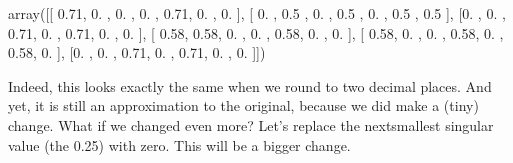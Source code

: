 \documentclass[letterpaper,10pt,english]{sphinxmanual}
\begin{document}
\begin{sphinxVerbatim}[commandchars=\\\{\}]
    
\PYG{p}{[}\PYG{p}{]}  
     
   
       
\end{sphinxVerbatim}

\begin{sphinxVerbatim}[commandchars=\\\{\}]
array([[ 0.71, \PYGZhy{}0.  ,  0.  , \PYGZhy{}0.  ,  0.71, \PYGZhy{}0.  , \PYGZhy{}0.  ],
       [ 0.  ,  0.5 , \PYGZhy{}0.  ,  0.5 , \PYGZhy{}0.  ,  0.5 ,  0.5 ],
       [\PYGZhy{}0.  , \PYGZhy{}0.  ,  0.71, \PYGZhy{}0.  ,  0.71, \PYGZhy{}0.  , \PYGZhy{}0.  ],
       [ 0.58,  0.58,  0.  ,  0.  ,  0.58,  0.  ,  0.  ],
       [ 0.58,  0.  , \PYGZhy{}0.  ,  0.58, \PYGZhy{}0.  ,  0.58,  0.  ],
       [\PYGZhy{}0.  , \PYGZhy{}0.  ,  0.71, \PYGZhy{}0.  ,  0.71, \PYGZhy{}0.  , \PYGZhy{}0.  ]])
\end{sphinxVerbatim}

Indeed, this looks exactly the same when we round to two decimal places.  And yet, it is still an approximation to the original, because we did make a (tiny) change.  What if we changed even more?  Let’s replace the next\sphinxhyphen{}smallest singular value (the 0.25) with zero.  This will be a bigger change.

\begin{sphinxVerbatim}[commandchars=\\\{\}]
\PYG{p}{[}\PYG{p}{]}  
     
   
       
\end{sphinxVerbatim}
\end{document}

